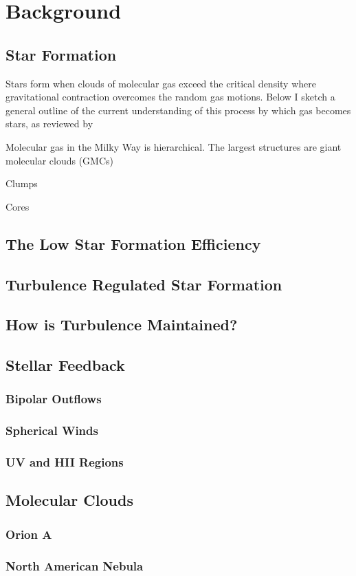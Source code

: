 \section{Background}

\subsection{Star Formation}
Stars form when clouds of molecular gas exceed the critical density where gravitational contraction overcomes the random gas motions. Below I sketch a general outline of the current understanding of this process by which gas becomes stars, as reviewed by \cite{McKee_2007} 

Molecular gas in the Milky Way is hierarchical. The largest structures are giant molecular clouds (GMCs)

Clumps

Cores

\subsection{The Low Star Formation Efficiency}

\subsection{Turbulence Regulated Star Formation}

\subsection{How is Turbulence Maintained?}

\subsection{Stellar Feedback}

\subsubsection{Bipolar Outflows}

\subsubsection{Spherical Winds}

\subsubsection{UV and HII Regions}

\subsection{Molecular Clouds}

\subsubsection{Orion A}

\subsubsection{North American Nebula}
  
  
  
  